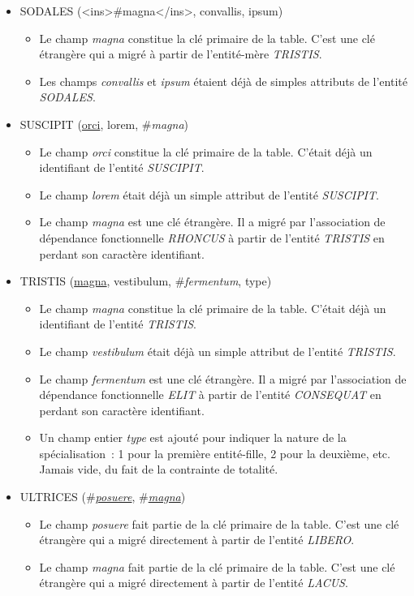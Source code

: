 \documentclass[a4paper]{article}
\newcommand{\relat}[1]{\textsc{#1}}
\newcommand{\attr}[1]{#1}
\newcommand{\prim}[1]{\uline{#1}}
\newcommand{\foreign}[1]{\#\textsl{#1}}
\begin{document}
\begin{itemize}
  \item \relat{SODALES} (<ins>#magna</ins>, \attr{convallis}, \attr{ipsum})
  \begin{itemize}
    \item Le champ \emph{magna} constitue la clé primaire de la table. C'est une clé étrangère qui a migré à partir de l'entité-mère \emph{TRISTIS}.
    \item Les champs \emph{convallis} et \emph{ipsum} étaient déjà de simples attributs de l'entité \emph{SODALES}.
  \end{itemize}

  \item \relat{SUSCIPIT} (\prim{orci}, \attr{lorem}, \foreign{magna})
  \begin{itemize}
    \item Le champ \emph{orci} constitue la clé primaire de la table. C'était déjà un identifiant de l'entité \emph{SUSCIPIT}.
    \item Le champ \emph{lorem} était déjà un simple attribut de l'entité \emph{SUSCIPIT}.
    \item Le champ \emph{magna} est une clé étrangère. Il a migré par l'association de dépendance fonctionnelle \emph{RHONCUS} à partir de l'entité \emph{TRISTIS} en perdant son caractère identifiant.
  \end{itemize}

  \item \relat{TRISTIS} (\prim{magna}, \attr{vestibulum}, \foreign{fermentum}, \attr{type})
  \begin{itemize}
    \item Le champ \emph{magna} constitue la clé primaire de la table. C'était déjà un identifiant de l'entité \emph{TRISTIS}.
    \item Le champ \emph{vestibulum} était déjà un simple attribut de l'entité \emph{TRISTIS}.
    \item Le champ \emph{fermentum} est une clé étrangère. Il a migré par l'association de dépendance fonctionnelle \emph{ELIT} à partir de l'entité \emph{CONSEQUAT} en perdant son caractère identifiant.
    \item Un champ entier \emph{type} est ajouté pour indiquer la nature de la spécialisation : 1 pour la première entité-fille, 2 pour la deuxième, etc. Jamais vide, du fait de la contrainte de totalité.
  \end{itemize}

  \item \relat{ULTRICES} (\foreign{\prim{posuere}}, \foreign{\prim{magna}})
  \begin{itemize}
    \item Le champ \emph{posuere} fait partie de la clé primaire de la table. C'est une clé étrangère qui a migré directement à partir de l'entité \emph{LIBERO}.
    \item Le champ \emph{magna} fait partie de la clé primaire de la table. C'est une clé étrangère qui a migré directement à partir de l'entité \emph{LACUS}.
  \end{itemize}

\end{itemize}
\end{document}
